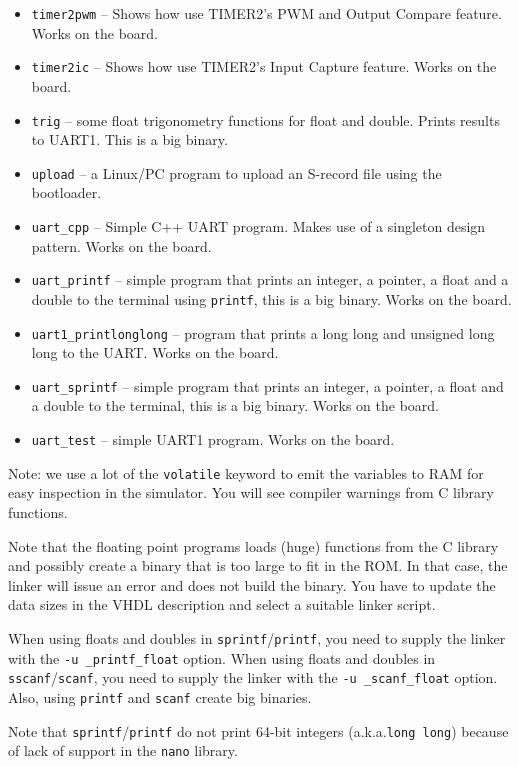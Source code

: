 \documentclass[12pt]{article}
\begin{document}
\begin{itemize}
\item \lstinline|timer2pwm| -- Shows how use TIMER2's PWM and Output Compare feature. Works on the board.
\item \lstinline|timer2ic| -- Shows how use TIMER2's Input Capture feature. Works on the board.
\item \lstinline|trig| -- some float trigonometry functions for float and double. Prints results to UART1. This is a big binary.
\item \lstinline|upload| -- a Linux/PC program to upload an S-record file using the bootloader.
\item \lstinline|uart_cpp| -- Simple C++ UART program. Makes use of a singleton design pattern. Works on the board.
\item \lstinline|uart_printf| -- simple program that prints an integer, a pointer, a float and a double to the terminal using \lstinline|printf|, this is a big binary. Works on the board.
\item \lstinline|uart1_printlonglong| -- program that prints a long long and unsigned long long to the UART. Works on the board.
\item \lstinline|uart_sprintf| -- simple program that prints an integer, a pointer, a float and a double to the terminal, this is a big binary. Works on the board.
\item \lstinline|uart_test| -- simple UART1 program. Works on the board.
\end{itemize} 

Note: we use a lot of the \lstinline|volatile| keyword to emit the variables to RAM for easy inspection in the simulator. You will see compiler warnings from C library functions.

Note that the floating point programs loads (huge) functions from the C library and possibly create a binary that is too large to fit in the ROM. In that case, the linker will issue an error and does not build the binary. You have to update the data sizes in the VHDL description and select a suitable linker script.

When using floats and doubles in \lstinline|sprintf|/\lstinline|printf|, you need to supply the linker with the \lstinline|-u _printf_float| option. When using floats and doubles in \lstinline|sscanf|/\lstinline|scanf|, you need to supply the linker with the \lstinline|-u _scanf_float| option. Also, using \lstinline|printf| and \lstinline|scanf| create big binaries.

Note that \lstinline|sprintf|/\lstinline|printf| do not print 64-bit integers (a.k.a.\@ \lstinline|long long|) because of lack of support in the \lstinline|nano| library.
\end{document}

